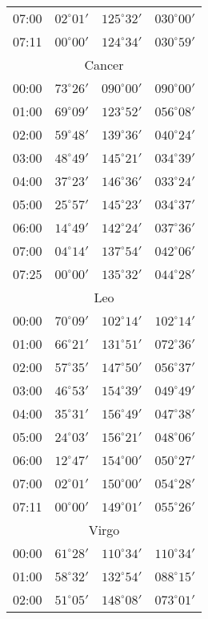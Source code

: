 \begin{table}
\begin{Parallel}{}{}
{{\begin{tabular}{l|lll}
07:00 & $02^\circ 01'$ & $125^\circ 32'$& $030^\circ 00'$ \\
07:11 & $00^\circ 00'$ & $124^\circ 34'$& $030^\circ 59'$ \\
\multicolumn{4}{c}{Cancer}\\
00:00 & $73^\circ 26'$ & $090^\circ 00'$& $090^\circ 00'$ \\
01:00 & $69^\circ 09'$ & $123^\circ 52'$& $056^\circ 08'$ \\
02:00 & $59^\circ 48'$ & $139^\circ 36'$& $040^\circ 24'$ \\
03:00 & $48^\circ 49'$ & $145^\circ 21'$& $034^\circ 39'$ \\
04:00 & $37^\circ 23'$ & $146^\circ 36'$& $033^\circ 24'$ \\
05:00 & $25^\circ 57'$ & $145^\circ 23'$& $034^\circ 37'$ \\
06:00 & $14^\circ 49'$ & $142^\circ 24'$& $037^\circ 36'$ \\
07:00 & $04^\circ 14'$ & $137^\circ 54'$& $042^\circ 06'$ \\
07:25 & $00^\circ 00'$ & $135^\circ 32'$& $044^\circ 28'$ \\
\multicolumn{4}{c}{Leo}\\
00:00 & $70^\circ 09'$ & $102^\circ 14'$& $102^\circ 14'$ \\
01:00 & $66^\circ 21'$ & $131^\circ 51'$& $072^\circ 36'$ \\
02:00 & $57^\circ 35'$ & $147^\circ 50'$& $056^\circ 37'$ \\
03:00 & $46^\circ 53'$ & $154^\circ 39'$& $049^\circ 49'$ \\
04:00 & $35^\circ 31'$ & $156^\circ 49'$& $047^\circ 38'$ \\
05:00 & $24^\circ 03'$ & $156^\circ 21'$& $048^\circ 06'$ \\
06:00 & $12^\circ 47'$ & $154^\circ 00'$& $050^\circ 27'$ \\
07:00 & $02^\circ 01'$ & $150^\circ 00'$& $054^\circ 28'$ \\
07:11 & $00^\circ 00'$ & $149^\circ 01'$& $055^\circ 26'$ \\
\multicolumn{4}{c}{Virgo}\\
00:00 & $61^\circ 28'$ & $110^\circ 34'$& $110^\circ 34'$ \\
01:00 & $58^\circ 32'$ & $132^\circ 54'$& $088^\circ 15'$ \\
02:00 & $51^\circ 05'$ & $148^\circ 08'$& $073^\circ 01'$ \\
\end{tabular}
}}
\ParallelRText{{\small
}}
\end{Parallel}
\end{table}
